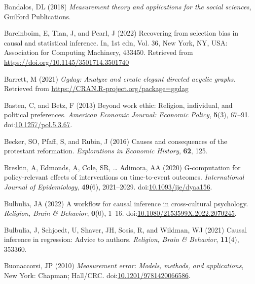 \documentclass[
  singlecolumn]{article}
\newlength{\cslhangindent}
\newlength{\cslentryspacingunit} %
\newenvironment{CSLReferences}[2] %
 {%
  \setlength{\parindent}{0pt}
  \ifodd #1
  \let\oldpar\par
  \def\par{\hangindent=\cslhangindent\oldpar}
  \fi
  \setlength{\parskip}{#2\cslentryspacingunit}
 }%
 {}
\begin{document}
\hypertarget{refs}{}
\begin{CSLReferences}{1}{0}
\leavevmode{}%
Bandalos, DL (2018) \emph{Measurement theory and applications for the
social sciences}, Guilford Publications.

\leavevmode{}%
Bareinboim, E, Tian, J, and Pearl, J (2022) Recovering from selection
bias in causal and statistical inference. In, 1st edn, Vol. 36, New
York, NY, USA: Association for Computing Machinery, 433450. Retrieved
from \url{https://doi.org/10.1145/3501714.3501740}

\leavevmode{}%
Barrett, M (2021) \emph{Ggdag: Analyze and create elegant directed
acyclic graphs}. Retrieved from
\url{https://CRAN.R-project.org/package=ggdag}

\leavevmode{}%
Basten, C, and Betz, F (2013) Beyond work ethic: Religion, individual,
and political preferences. \emph{American Economic Journal: Economic
Policy}, \textbf{5}(3), 67--91.
doi:\href{https://doi.org/10.1257/pol.5.3.67}{10.1257/pol.5.3.67}.

\leavevmode{}%
Becker, SO, Pfaff, S, and Rubin, J (2016) Causes and consequences of the
protestant reformation. \emph{Explorations in Economic History},
\textbf{62}, 125.

\leavevmode{}%
Breskin, A, Edmonds, A, Cole, SR, \ldots{} Adimora, AA (2020)
G-computation for policy-relevant effects of interventions on
time-to-event outcomes. \emph{International Journal of Epidemiology},
\textbf{49}(6), 2021--2029.
doi:\href{https://doi.org/10.1093/ije/dyaa156}{10.1093/ije/dyaa156}.

\leavevmode{}%
Bulbulia, JA (2022) A workflow for causal inference in cross-cultural
psychology. \emph{Religion, Brain \& Behavior}, \textbf{0}(0), 1--16.
doi:\href{https://doi.org/10.1080/2153599X.2022.2070245}{10.1080/2153599X.2022.2070245}.

\leavevmode{}%
Bulbulia, J, Schjoedt, U, Shaver, JH, Sosis, R, and Wildman, WJ (2021)
Causal inference in regression: Advice to authors. \emph{Religion, Brain
\& Behavior}, \textbf{11}(4), 353360.

\leavevmode{}%
Buonaccorsi, JP (2010) \emph{Measurement error: Models, methods, and
applications}, New York: Chapman; Hall/CRC.
doi:\href{https://doi.org/10.1201/9781420066586}{10.1201/9781420066586}.


\end{CSLReferences}
\end{document}
